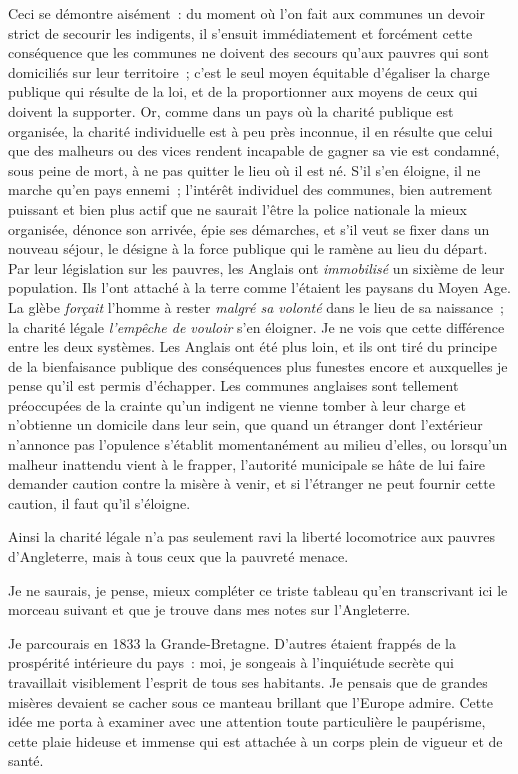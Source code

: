 \documentclass[twoside]{book} %
\begin{document}
\noindent Ceci se démontre aisément : du moment où l’on fait aux communes un devoir strict de secourir les indigents, il s’ensuit immédiatement et forcément cette conséquence que les communes ne doivent des secours qu’aux pauvres qui sont domiciliés sur leur territoire ; c’est le seul moyen équitable d’égaliser la charge publique qui résulte de la loi, et de la proportionner aux moyens de ceux qui doivent la supporter. Or, comme dans un pays où la charité publique est organisée, la charité individuelle est à peu près inconnue, il en résulte que celui que des malheurs ou des vices rendent incapable de gagner sa vie est condamné, sous peine de mort, à ne pas quitter le lieu où il est né. S'il s’en éloigne, il ne marche qu’en pays ennemi ; l’intérêt individuel des communes, bien autrement puissant et bien plus actif que ne saurait l’être la police nationale la mieux organisée, dénonce son arrivée, épie ses démarches, et s’il veut se fixer dans un nouveau séjour, le désigne à la force publique qui le ramène au lieu du départ. Par leur législation sur les pauvres, les Anglais ont \emph{immobilisé} un sixième de leur population. Ils l’ont attaché à la terre comme l’étaient les paysans du Moyen Age. La glèbe \emph{forçait} l’homme à rester \emph{malgré sa volonté} dans le lieu de sa naissance ; la charité légale \emph{l’empêche de vouloir} s’en éloigner. Je ne vois que cette différence entre les deux systèmes. Les Anglais ont été plus loin, et ils ont tiré du principe de la bienfaisance publique des conséquences plus funestes encore et auxquelles je pense qu’il est permis d’échapper. Les communes anglaises sont tellement préoccupées de la crainte qu’un indigent ne vienne tomber à leur charge et n’obtienne un domicile dans leur sein, que quand un étranger dont l’extérieur n’annonce pas l’opulence s’établit momentanément au milieu d’elles, ou lorsqu’un malheur inattendu vient à le frapper, l’autorité municipale se hâte de lui faire demander caution contre la misère à venir, et si l’étranger ne peut fournir cette caution, il faut qu’il s’éloigne.\par
Ainsi la charité légale n’a pas seulement ravi la liberté locomotrice aux pauvres d’Angleterre, mais à tous ceux que la pauvreté menace.\par
\bigbreak
\noindent Je ne saurais, je pense, mieux compléter ce triste tableau qu’en transcrivant ici le morceau suivant et que je trouve dans mes notes sur l’Angleterre.\par
Je parcourais en 1833 la Grande-Bretagne. D'autres étaient frappés de la prospérité intérieure du pays : moi, je songeais à l’inquiétude secrète qui travaillait visiblement l’esprit de tous ses habitants. Je pensais que de grandes misères devaient se cacher sous ce manteau brillant que l’Europe admire. Cette idée me porta à examiner avec une attention toute particulière le paupérisme, cette plaie hideuse et immense qui est attachée à un corps plein de vigueur et de santé.\par
\end{document}
